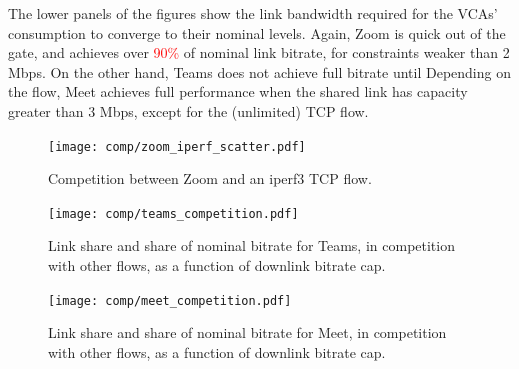 The lower panels of the figures show
  the link bandwidth required for the VCAs' consumption
  to converge to their nominal levels.
Again, Zoom is quick out of the gate, and 
  achieves over \textcolor{red}{90\%} of nominal link bitrate,
  for constraints weaker than 2 Mbps.
On the other hand, Teams does not achieve full bitrate
  until 
Depending on the flow, Meet achieves full 
  performance when the shared link has capacity greater than 3 Mbps, 
  except for the (unlimited) TCP flow.
  





\begin{figure}[]
    \texttt{[image: comp/zoom\_iperf\_scatter.pdf]}
    \caption{Competition between Zoom and an iperf3 TCP flow. }
	\label{fig:comp_zoom_iperf}
\end{figure}

\begin{figure}[]
    \texttt{[image: comp/teams\_competition.pdf]}
    \caption{Link share and share of nominal bitrate for Teams, in competition with other flows, as a function of downlink bitrate cap. }
	\label{fig:teams_comp_bitrates}
\end{figure}

\begin{figure}[]
    \texttt{[image: comp/meet\_competition.pdf]}
    \caption{Link share and share of nominal bitrate for Meet, in competition with other flows, as a function of downlink bitrate cap.}
	\label{fig:meet_comp_bitrates}
\end{figure}

